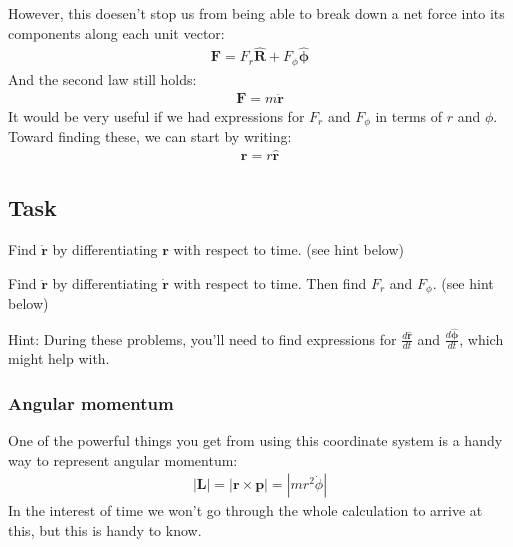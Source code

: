 \documentclass[letterpaper,10pt,english]{jupyterBook}
\begin{document}
\sphinxAtStartPar
However, this doesen’t stop us from being able to break down a net force into its components along each unit vector:
\begin{equation*}
\begin{split}
\mathbf{F} = F_r \hat{\mathbf{R}} + F_\phi \hat{\boldsymbol{\phi}}
\end{split}
\end{equation*}
\sphinxAtStartPar
And the second law still holds:
\begin{equation*}
\begin{split}
\mathbf{F} = m\ddot{\mathbf{r}}
\end{split}
\end{equation*}
\sphinxAtStartPar
It would be very useful if we had expressions for \(F_r\) and \(F_\phi\) in terms of \(r\) and \(\phi\). Toward finding these, we can start by writing:
\begin{equation*}
\begin{split}
\mathbf{r} = r\hat{\mathbf{r}}
\end{split}
\end{equation*}

\subsection{Task}
\label{\detokenize{content/1_mechanics/frames:task}}
\sphinxAtStartPar
{}

\sphinxAtStartPar
Find \(\dot{\mathbf{r}}\) by differentiating \(\mathbf{r}\) with respect to time. (see hint below)

\sphinxAtStartPar
{}

\sphinxAtStartPar
Find \(\ddot{\mathbf{r}}\) by differentiating \(\dot{\mathbf{r}}\) with respect to time. Then find \(F_r\) and \(F_\phi\). (see hint below)





\sphinxAtStartPar
Hint: During these problems, you’ll need to find expressions for \(\frac{d\hat{\mathbf{r}}}{dt}\) and \(\frac{d\hat{\boldsymbol{\phi}}}{dt}\), which  might help with.


\subsubsection{Angular momentum}
\label{\detokenize{content/1_mechanics/frames:angular-momentum}}
\sphinxAtStartPar
One of the powerful things you get from using this coordinate system is a handy way to represent angular momentum:
\begin{equation*}
\begin{split}
|\mathbf{L}| = |\mathbf{r} \times \mathbf{p}| = |mr^2\dot{\phi}|
\end{split}
\end{equation*}
\sphinxAtStartPar
In the interest of time we won’t go through the whole calculation to arrive at this, but this is handy to know.
\end{document}
